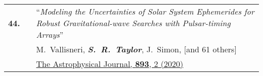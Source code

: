 \documentclass[11pt,letterpaper,sans]{moderncv}
\begin{document}
{\begin{longtable}{rp{0.3cm}p{15.8cm}}
\textbf{44.} & & ``\textit{Modeling the Uncertainties of Solar System Ephemerides for Robust Gravitational-wave Searches with Pulsar-timing Arrays}'' \\ 
&&M.~Vallisneri, \textit{\textbf{S.~R.~Taylor}}, J.~Simon, [and 61 others] \\
&& \href{https://ui.adsabs.harvard.edu/link_gateway/2020ApJ...893..112V/PUB_HTML}{{\color{color1} The Astrophysical Journal, \textbf{893}, 2 (2020)}} \\

\end{longtable}}
\end{document}
